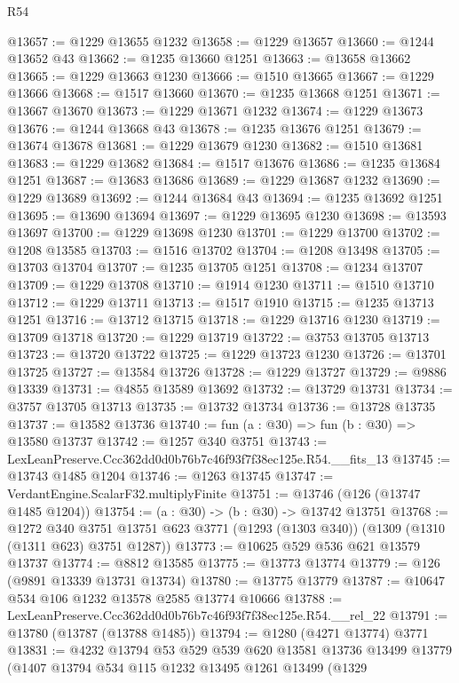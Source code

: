 \begin{lexlean}{R54}
\begin{coremodule}
@13657 := @1229 @13655 @1232
@13658 := @1229 @13657
@13660 := @1244 @13652 @43
@13662 := @1235 @13660 @1251
@13663 := @13658 @13662
@13665 := @1229 @13663 @1230
@13666 := @1510 @13665
@13667 := @1229 @13666
@13668 := @1517 @13660
@13670 := @1235 @13668 @1251
@13671 := @13667 @13670
@13673 := @1229 @13671 @1232
@13674 := @1229 @13673
@13676 := @1244 @13668 @43
@13678 := @1235 @13676 @1251
@13679 := @13674 @13678
@13681 := @1229 @13679 @1230
@13682 := @1510 @13681
@13683 := @1229 @13682
@13684 := @1517 @13676
@13686 := @1235 @13684 @1251
@13687 := @13683 @13686
@13689 := @1229 @13687 @1232
@13690 := @1229 @13689
@13692 := @1244 @13684 @43
@13694 := @1235 @13692 @1251
@13695 := @13690 @13694
@13697 := @1229 @13695 @1230
@13698 := @13593 @13697
@13700 := @1229 @13698 @1230
@13701 := @1229 @13700
@13702 := @1208 @13585
@13703 := @1516 @13702
@13704 := @1208 @13498
@13705 := @13703 @13704
@13707 := @1235 @13705 @1251
@13708 := @1234 @13707
@13709 := @1229 @13708
@13710 := @1914 @1230
@13711 := @1510 @13710
@13712 := @1229 @13711
@13713 := @1517 @1910
@13715 := @1235 @13713 @1251
@13716 := @13712 @13715
@13718 := @1229 @13716 @1230
@13719 := @13709 @13718
@13720 := @1229 @13719
@13722 := @3753 @13705 @13713
@13723 := @13720 @13722
@13725 := @1229 @13723 @1230
@13726 := @13701 @13725
@13727 := @13584 @13726
@13728 := @1229 @13727
@13729 := @9886 @13339
@13731 := @4855 @13589 @13692
@13732 := @13729 @13731
@13734 := @3757 @13705 @13713
@13735 := @13732 @13734
@13736 := @13728 @13735
@13737 := @13582 @13736
@13740 := fun (a : @30) => fun (b : @30) => @13580 @13737
@13742 := @1257 @340 @3751
@13743 := LexLeanPreserve.Ccc362dd0d0b76b7c46f93f7f38ec125e.R54.__fits_13
@13745 := @13743 @1485 @1204
@13746 := @1263 @13745
@13747 := VerdantEngine.ScalarF32.multiplyFinite
@13751 := @13746 (@126 (@13747 @1485 @1204))
@13754 := (a : @30) -> (b : @30) -> @13742 @13751
@13768 := @1272
    @340
    @3751
    @13751
    @623
    @3771
    (@1293 (@1303 @340))
    (@1309 (@1310 (@1311 @623) @3751 @1287))
@13773 := @10625 @529 @536 @621 @13579 @13737
@13774 := @8812 @13585
@13775 := @13773 @13774
@13779 := @126 (@9891 @13339 @13731 @13734)
@13780 := @13775 @13779
@13787 := @10647 @534 @106 @1232 @13578 @2585 @13774 @10666
@13788 := LexLeanPreserve.Ccc362dd0d0b76b7c46f93f7f38ec125e.R54.__rel_22
@13791 := @13780 (@13787 (@13788 @1485))
@13794 := @1280 (@4271 @13774) @3771
@13831 := @4232
    @13794
    @53
    @529
    @539
    @620
    @13581
    @13736
    @13499
    @13779
    (@1407
      @13794
      @534
      @115
      @1232
      @13495
      @1261
      @13499
      (@1329

\end{coremodule}
\end{lexlean}

